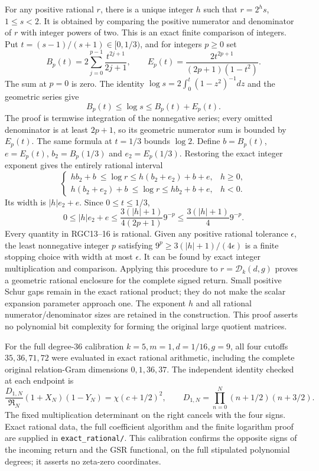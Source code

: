 For any positive rational $r$, there is a unique integer $h$
such that $r=2^h s$, $1\le s<2$. It is obtained by comparing
the positive numerator and denominator of $r$ with integer
powers of two. This is an exact finite comparison of integers.
Put $t=(s-1)/(s+1)\in[0,1/3)$, and for integers $p\ge0$ set
\[
 B_p(t)=2\sum_{j=0}^{p-1}\frac{t^{2j+1}}{2j+1},\qquad
 E_p(t)=\frac{2t^{2p+1}}{(2p+1)(1-t^2)}.
 \tag{RGC13}
\]
The sum at $p=0$ is zero. The identity
$\log s=2\int_0^t(1-z^2)^{-1}dz$ and the geometric series give
\[
 B_p(t)\le\log s\le B_p(t)+E_p(t).
 \tag{RGC14}
\]
The proof is termwise integration of the nonnegative series;
every omitted denominator is at least $2p+1$, so its geometric
numerator sum is bounded by $E_p(t)$. The same formula at
$t=1/3$ bounds $\log2$. Define $b=B_p(t)$, $e=E_p(t)$,
$b_2=B_p(1/3)$ and $e_2=E_p(1/3)$. Restoring the exact
integer exponent gives the entirely rational interval
\[
 \begin{cases}
 h b_2+b\ \le\log r\le h(b_2+e_2)+b+e,&h\ge0,\\
 h(b_2+e_2)+b\ \le\log r\le h b_2+b+e,&h<0.
 \end{cases}\tag{RGC15}
\]
Its width is $|h|e_2+e$. Since $0\le t\le1/3$,
\[
 0\le |h|e_2+e
 \le\frac{3(|h|+1)}{4(2p+1)}9^{-p}
 \le\frac{3(|h|+1)}4 9^{-p}.
 \tag{RGC16}
\]
Every quantity in RGC13--16 is rational. Given any positive
rational tolerance $\epsilon$, the least nonnegative integer
$p$ satisfying $9^p\ge3(|h|+1)/(4\epsilon)$ is a finite
stopping choice with width at most $\epsilon$. It can be found
by exact integer multiplication and comparison. Applying this
procedure to $r=\mathcal D_k(d,g)$ proves a geometric rational
enclosure for the complete signed return. Small positive
Schur gaps remain in the exact rational product; they do not
make the scalar expansion parameter approach one. The exponent
$h$ and all rational numerator/denominator sizes are retained
in the construction. This proof asserts no polynomial bit
complexity for forming the original large quotient matrices.

For the full degree-$36$ calibration $k=5,m=1,d=1/16,g=9$,
all four cutoffs $35,36,71,72$ were evaluated in exact rational
arithmetic, including the complete original relation-Gram
dimensions $0,1,36,37$. The independent identity checked at
each endpoint is
\[
 \frac{D_{1,N}}{\mathfrak R_N}
       (1+X_N)(1-Y_N)=\chi(c+1/2)^2,
 \qquad D_{1,N}=\prod_{n=0}^N(n+1/2)(n+3/2).
\]
The fixed multiplication determinant on the right cancels
with the four signs. Exact rational data, the full coefficient
algorithm and the finite logarithm proof are supplied in
\texttt{exact\_rational/}. This calibration confirms the
opposite signs of the incoming return and the GSR functional,
on the full stipulated polynomial degrees; it asserts no
zeta-zero coordinates.
